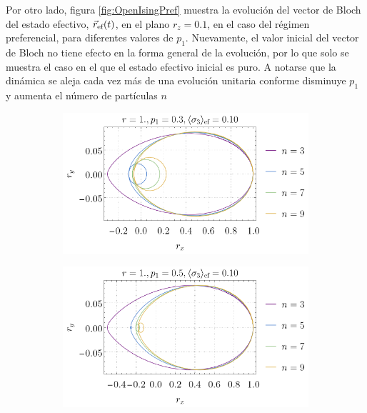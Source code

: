Por otro lado, figura \ref{fig:OpenIsingPref} muestra la evolución del vector de Bloch del estado efectivo, $\vec{r}_{\text{ef}}(t)$, en el plano $r_{z}=0.1$, en el caso del régimen preferencial, para diferentes valores de $p_{1}$. Nuevamente, el valor inicial del vector de Bloch no tiene efecto en la forma general de la evolución, por lo que solo se muestra el caso en el que el estado efectivo inicial es puro. A notarse que la dinámica se aleja cada vez más de una evolución unitaria conforme disminuye $p_{1}$ y aumenta el número de partículas $n$

\begin{figure}
    \centering
    \begin{subfigure}[b]{0.475\textwidth}
        \centering
        \includegraphics[width=\textwidth]{chapter4/figures_special/Ising_Pref_p1=0.3_z=0.10.png}
    \end{subfigure}
    \hfill
    \begin{subfigure}[b]{0.475\textwidth}  
        \centering 
        \includegraphics[width=\textwidth]{chapter4/figures_special/Ising_Pref_p1=0.5_z=0.10.png}
    \end{subfigure}

\end{figure}
